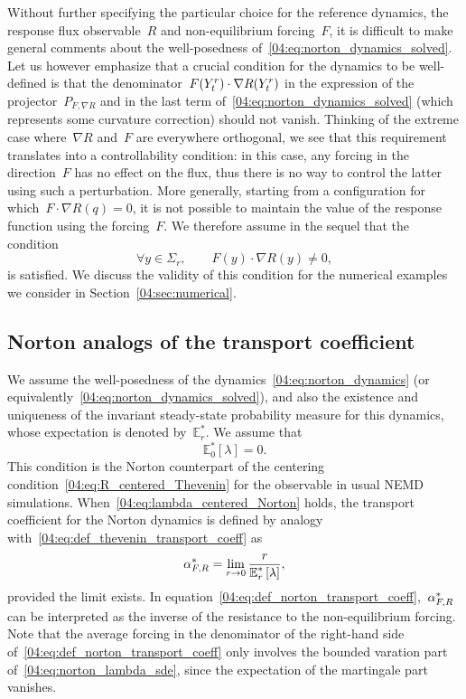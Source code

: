Without further specifying the particular choice for the reference dynamics, the response flux observable~$R$ and non-equilibrium forcing~$F$, it is difficult to make general comments about the well-posedness of~\eqref{04:eq:norton_dynamics_solved}.
Let us however emphasize that a crucial condition for the dynamics to be well-defined is that the denominator~$F(Y^r_t) \cdot \nabla R(Y^r_t)$ in the expression of the projector~$P_{F,\nabla R}$ and in the last term of~\eqref{04:eq:norton_dynamics_solved} (which represents some curvature correction) should not vanish.
Thinking of the extreme case where~$\nabla R$ and~$F$ are everywhere orthogonal, we see that this requirement translates into a controllability condition: in this case, any forcing in the direction~$F$ has no effect on the flux, thus there is no way to control the latter using such a perturbation. More generally, starting from a configuration for which~$F\cdot \nabla R(q)=0$, it is not possible to maintain the value of the response function using the forcing~$F$. We therefore assume in the sequel that the condition
\begin{equation}
    \label{04:eq:norton_controllability_condition}
    \forall y\in\Sigma_r,\qquad F(y)\cdot \nabla R(y) \neq 0,
\end{equation}
is satisfied. We discuss the validity of this condition for the numerical examples we consider in Section~\ref{04:sec:numerical}.

\subsection{Norton analogs of the transport coefficient}\label{04:subsec:norton_tc}
We assume the well-posedness of the dynamics~\eqref{04:eq:norton_dynamics} (or equivalently~\eqref{04:eq:norton_dynamics_solved}), and also the existence and uniqueness of the invariant steady-state probability measure for this dynamics, whose expectation is denoted by~$\mathbb{E}_{r}^*$. We assume that
\begin{equation}
   \label{04:eq:lambda_centered_Norton}
   \mathbb{E}_0^*[\lambda]=0.
\end{equation}
This condition is the Norton counterpart of the centering  condition~\eqref{04:eq:R_centered_Thevenin} for the observable in usual NEMD simulations. When~\eqref{04:eq:lambda_centered_Norton} holds, the transport coefficient for the Norton dynamics is defined by analogy with~\eqref{04:eq:def_thevenin_transport_coeff} as
\begin{equation}
    \label{04:eq:def_norton_transport_coeff}
    \alpha_{F,R}^* = \underset{r\to 0}{\lim}\,\frac{r}{\displaystyle{\mathbb{E}_r^* \left[\lambda\right]}},
\end{equation}
provided the limit exists. In equation~\eqref{04:eq:def_norton_transport_coeff},~$\alpha_{F,R}^*$ can be interpreted as the inverse of the resistance to the non-equilibrium forcing. Note that the average forcing in the denominator of the right-hand side of~\eqref{04:eq:def_norton_transport_coeff} only involves the bounded varation part of~\eqref{04:eq:norton_lambda_sde}, since the expectation of the martingale part vanishes.

